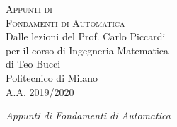 \documentclass[10pt,a4paper]{book}
\begin{document}






%


\pagestyle{empty} %
\vspace*{\fill}
\begin{center}
	{\large \textsc{Appunti di}}\\
	\vspace*{0.4cm}
	{\Huge \textsc{Fondamenti di Automatica}}\\
	\vspace*{1cm}
	{\large {Dalle lezioni del Prof. Carlo Piccardi}}\\
	\vspace*{0.1cm}
	{\large per il corso di Ingegneria Matematica}\\
	\vspace*{0.4cm}
	{\large {di Teo Bucci}}\\
	\vspace*{1cm}
	Politecnico di Milano\\A.A. 2019/2020
\end{center}
\vspace*{\fill}
\newpage










{\Large \textit{Appunti di Fondamenti di Automatica}}

\vspace*{\fill}
\end{document}
